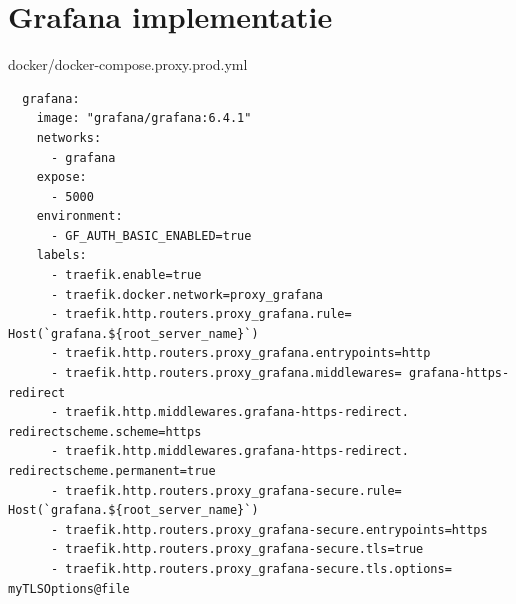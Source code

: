\section{Grafana implementatie} \label{GrafanaImplementatie}
docker/docker-compose.proxy.prod.yml
\begin{verbatim}
  grafana:
    image: "grafana/grafana:6.4.1"
    networks:
      - grafana
    expose:
      - 5000
    environment:
      - GF_AUTH_BASIC_ENABLED=true
    labels:
      - traefik.enable=true
      - traefik.docker.network=proxy_grafana
      - traefik.http.routers.proxy_grafana.rule= Host(`grafana.${root_server_name}`)
      - traefik.http.routers.proxy_grafana.entrypoints=http
      - traefik.http.routers.proxy_grafana.middlewares= grafana-https-redirect
      - traefik.http.middlewares.grafana-https-redirect. redirectscheme.scheme=https
      - traefik.http.middlewares.grafana-https-redirect. redirectscheme.permanent=true
      - traefik.http.routers.proxy_grafana-secure.rule= Host(`grafana.${root_server_name}`)
      - traefik.http.routers.proxy_grafana-secure.entrypoints=https
      - traefik.http.routers.proxy_grafana-secure.tls=true
      - traefik.http.routers.proxy_grafana-secure.tls.options= myTLSOptions@file
\end{verbatim}